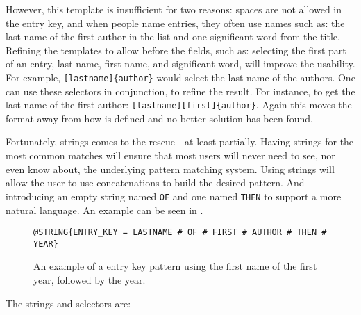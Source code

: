 However, this template is insufficient for two reasons: spaces are not
allowed in the entry key, and when people name entries, they often use
names such as: the last name of the first author in the list and one
significant word from the title.  Refining the templates to allow
 before the fields, such as: selecting the first
part of an entry, last name, first name, and significant word, will
improve the usability.  For example, \texttt{[lastname]\{author\}}
would select the last name of the authors.  One can use these
selectors in conjunction, to refine the result.  For instance, to get
the last name of the first author:
\texttt{[lastname][first]\{author\}}.  Again this moves the format
away from how {\bibtex} is defined and no better solution has been
found.

Fortunately, {\bibtex} strings comes to the rescue - at least
partially.  Having strings for the most common matches will ensure
that most users will never need to see, nor even know about, the
underlying pattern matching system.  Using strings will allow the user
to use concatenations to build the desired pattern.  And introducing
an empty string named \texttt{OF} and one named \texttt{THEN} to
support a more natural language.  An example can be seen in
.

\begin{figure}
  \centering
\begin{small}
\begin{verbatim}
@STRING{ENTRY_KEY = LASTNAME # OF # FIRST # AUTHOR # THEN # YEAR}
\end{verbatim}
\end{small}
\caption{An example of a entry key pattern using the first name of
    the first year, followed by the year.}
\label{fig:analyzing_entry_key_pattern}
\end{figure}

The strings and selectors are:

